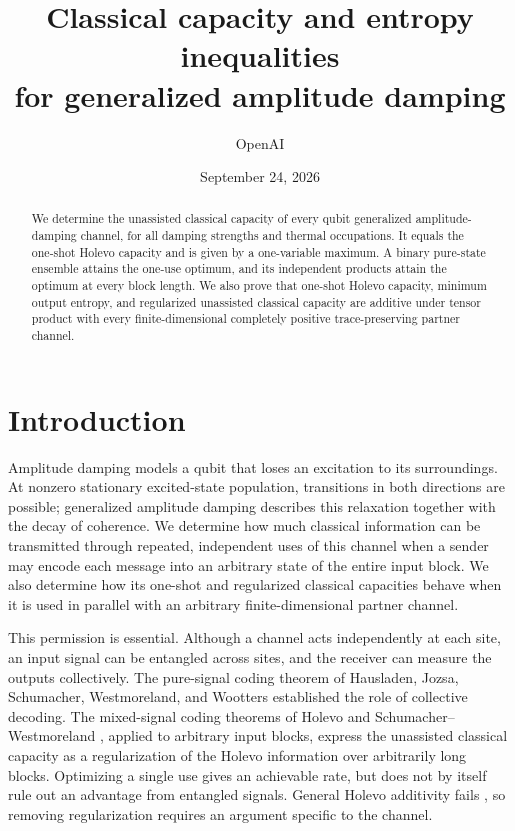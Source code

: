 \documentclass[11pt]{article}
\title{Classical capacity and entropy inequalities\\for generalized amplitude damping}
\author{OpenAI}
\date{September 24, 2026}
\theoremstyle{remark}
\numberwithin{equation}{section}
\begin{document}
\maketitle
\begin{abstract}
We determine the unassisted classical capacity of every qubit generalized
amplitude-damping channel, for all damping strengths and thermal
occupations. It equals the one-shot Holevo capacity and is given by a
one-variable maximum. A binary pure-state ensemble attains the one-use
optimum, and its independent products attain the optimum at every block
length. We also prove that one-shot Holevo capacity, minimum output entropy,
and regularized unassisted classical capacity are additive under tensor
product with every finite-dimensional completely positive trace-preserving
partner channel.
\end{abstract}

\section{Introduction}

Amplitude damping models a qubit that loses an excitation to its
surroundings. At nonzero stationary excited-state population, transitions
in both directions are possible; generalized amplitude damping describes
this relaxation together with the decay of coherence. We determine how
much classical information can be transmitted through repeated,
independent uses of this channel when a sender may encode each message
into an arbitrary state of the entire input block. We also determine
how its one-shot and regularized classical capacities behave when it is
used in parallel with an arbitrary finite-dimensional partner channel.

This permission is essential. Although a channel acts independently at
each site, an input signal can be entangled across sites, and the receiver
can measure the outputs collectively. The pure-signal coding theorem
of Hausladen, Jozsa, Schumacher, Westmoreland, and Wootters
\cite{HausladenEtAl1996} established the role of collective decoding.
The mixed-signal coding theorems of Holevo and Schumacher--Westmoreland
\cite{Holevo1998,SchumacherWestmoreland1997}, applied to arbitrary input
blocks, express the unassisted classical capacity as a regularization of the
Holevo information over arbitrarily long blocks. Optimizing a single
use gives an achievable rate, but does not by itself rule out an
advantage from entangled signals. General Holevo additivity fails
\cite{Hastings2009}, so removing regularization requires an argument
specific to the channel.
\end{document}
